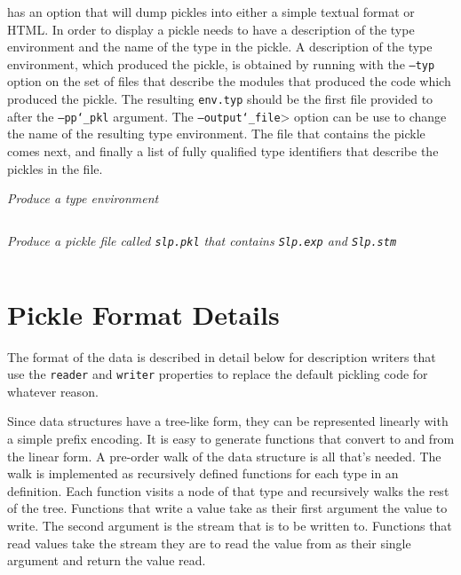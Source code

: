 \asdlgen{} has an option that will dump pickles into either a simple
textual format or HTML.
In order to display a pickle \asdlgen{} needs
to have a description of the type environment and the name of the type
in the pickle.
A description of the type environment, which produced
the pickle, is obtained by running \asdlgen{} with the \texttt{--typ} option
on the set of files that describe the modules that produced the code
which produced the pickle.
The resulting \texttt{env.typ} should be the
first file provided to \asdlgen{} after the \texttt{--pp\char`\_pkl}
argument.
The \texttt{--output\char`\_file}> option can be use to change the name
of the resulting type environment.
The file that contains the pickle
comes next, and finally a list of fully qualified type identifiers
that describe the pickles in the file.

\emph{Produce a type environment}\\
\begin{quote}\begin{lstlisting}[language=bash]
% asdlGen --typ slp.asdl --output_file=slp.typ
\end{lstlisting}\end{quote}%

\emph{Produce a pickle file called \texttt{slp.pkl} that contains \texttt{Slp.exp} 
and \texttt{Slp.stm}}\\
\begin{quote}\begin{lstlisting}[language=bash]
% asdlGen --pp_pkl slp.typ slp.pkl Slp.exp Slp.stm <newline>
\end{lstlisting}\end{quote}%

\section{Pickle Format Details}

The format of the data is described in
detail below for description writers that use the \texttt{reader} and
\texttt{writer} properties to replace the default pickling code for whatever
reason.

Since \asdl{} data structures have a tree-like form, they can be represented
linearly with a simple prefix encoding. It is easy to generate functions
that convert to and from the linear form.  A pre-order walk of the data
structure is all that's needed. The walk is implemented as recursively
defined functions for each type in an \asdl{} definition. Each function visits
a node of that type and recursively walks the rest of the tree. Functions
that write a value take as their first argument the value to write. The
second argument is the stream that is to be written to. Functions that read
values take the stream they are to read the value from as their single
argument and return the value read. 

